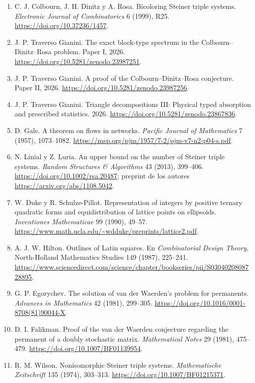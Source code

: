 \documentclass[spanish,11pt,a4paper]{article}
\providecommand{\tightlist}{\setlength{\itemsep}{0pt}\setlength{\parskip}{0pt}}
\begin{document}
\begin{enumerate}
\def\labelenumi{\arabic{enumi}.}
\tightlist
\item
  C. J. Colbourn, J. H. Dinitz y A. Rosa. Bicoloring Steiner triple systems. \emph{Electronic Journal of Combinatorics} 6 (1999), R25. \url{https://doi.org/10.37236/1457}.
\item
  J. P. Traverso Gianini. The exact block-type spectrum in the Colbourn--Dinitz--Rosa problem. Paper I, 2026. \url{https://doi.org/10.5281/zenodo.23987251}.
\item
  J. P. Traverso Gianini. A proof of the Colbourn--Dinitz--Rosa conjecture. Paper II, 2026. \url{https://doi.org/10.5281/zenodo.23987256}.
\item
  J. P. Traverso Gianini. Triangle decompositions III: Physical typed absorption and prescribed statistics. 2026. \url{https://doi.org/10.5281/zenodo.23867836}.
\item
  D. Gale. A theorem on flows in networks. \emph{Pacific Journal of Mathematics} 7 (1957), 1073--1082. \url{https://msp.org/pjm/1957/7-2/pjm-v7-n2-p04-s.pdf}.
\item
  N. Linial y Z. Luria. An upper bound on the number of Steiner triple systems. \emph{Random Structures \& Algorithms} 43 (2013), 399--406. \url{https://doi.org/10.1002/rsa.20487}; preprint de los autores \url{https://arxiv.org/abs/1108.5042}.
\item
  W. Duke y R. Schulze-Pillot. Representation of integers by positive ternary quadratic forms and equidistribution of lattice points on ellipsoids. \emph{Inventiones Mathematicae} 99 (1990), 49--57. \url{https://www.math.ucla.edu/~wdduke/preprints/lattice2.pdf}.
\item
  A. J. W. Hilton. Outlines of Latin squares. En \emph{Combinatorial Design Theory}, North-Holland Mathematics Studies 149 (1987), 225--241. \url{https://www.sciencedirect.com/science/chapter/bookseries/pii/S0304020808728895}.
\item
  G. P. Egorychev. The solution of van der Waerden's problem for permanents. \emph{Advances in Mathematics} 42 (1981), 299--305. \url{https://doi.org/10.1016/0001-8708(81)90044-X}.
\item
  D. I. Falikman. Proof of the van der Waerden conjecture regarding the permanent of a doubly stochastic matrix. \emph{Mathematical Notes} 29 (1981), 475--479. \url{https://doi.org/10.1007/BF01139954}.
\item
  R. M. Wilson. Nonisomorphic Steiner triple systems. \emph{Mathematische Zeitschrift} 135 (1974), 303--313. \url{https://doi.org/10.1007/BF01215371}.

\end{enumerate}
\end{document}
